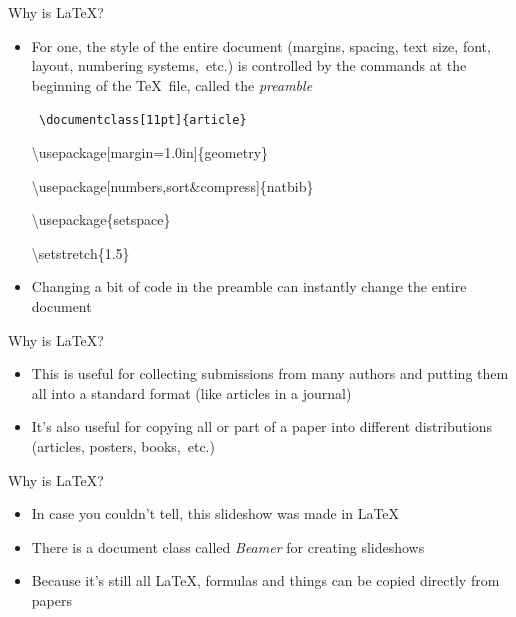 \documentclass{beamer} %
\begin{document}
\begin{frame}{Why is \LaTeX?}

\begin{itemize}
	\item For one, the style of the entire document (margins, spacing, text size, font, layout, numbering systems,~etc.) is controlled by the commands at the beginning of the \TeX\ file, called the \textit{preamble}
	
	\quad
	
	{\tt
	\textbackslash documentclass[11pt]\{article\}
	
	\textbackslash usepackage[margin=1.0in]\{geometry\}
	
	\textbackslash usepackage[numbers,sort\&compress]\{natbib\}
	
	\textbackslash usepackage\{setspace\}
	
	\textbackslash setstretch\{1.5\}
	}
	
	\quad
	
	\item Changing a bit of code in the preamble can instantly change the entire document
\end{itemize}

\end{frame}

\begin{frame}{Why is \LaTeX?}

\begin{itemize}
	\item This is useful for collecting submissions from many authors and putting them all into a standard format (like articles in a journal)
	\item It's also useful for copying all or part of a paper into different distributions (articles, posters, books,~etc.)
\end{itemize}

\end{frame}

\begin{frame}{Why is \LaTeX?}

\begin{itemize}
	\item In case you couldn't tell, this slideshow was made in \LaTeX
	\item There is a document class called \textit{Beamer} for creating slideshows
	\item Because it's still all \LaTeX, formulas and things can be copied directly from papers
\end{itemize}

\end{frame}
\end{document}
